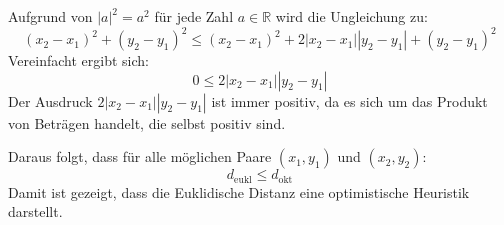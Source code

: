 Aufgrund von $|a|^2 = a^2$ für jede Zahl $a\in\mathbb{R}$ wird die Ungleichung zu:
\begin{equation*}
(x_2 - x_1)^2 + (y_2 - y_1)^2 \leq (x_2 - x_1)^2 + 2|x_2 - x_1||y_2 - y_1| + (y_2 - y_1)^2
\end{equation*}
Vereinfacht ergibt sich:
\begin{equation*}
    0 \leq 2|x_2 - x_1||y_2 - y_1|
\end{equation*}
Der Ausdruck $2|x_2 - x_1||y_2 - y_1|$ ist immer positiv, da es sich um das Produkt von Beträgen handelt, die selbst positiv sind.

Daraus folgt, dass für alle möglichen Paare $(x_1, y_1)$ und $(x_2, y_2)$:
\begin{equation*}
    d_\text{eukl} \leq d_\text{okt}
\end{equation*}
Damit ist gezeigt, dass die Euklidische Distanz eine optimistische Heuristik darstellt.